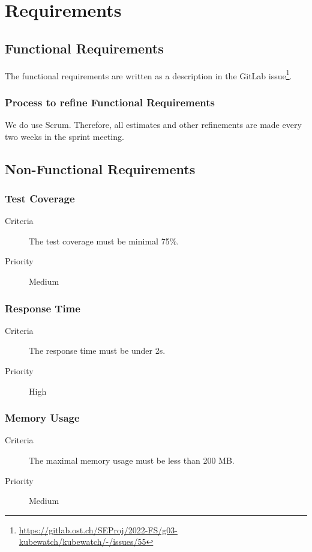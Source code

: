 \chapter{Requirements}



\section {Functional Requirements}
The functional requirements are written as a description in the GitLab issue\footnote{\url{https://gitlab.ost.ch/SEProj/2022-FS/g03-kubewatch/kubewatch/-/issues/55}}.

\subsection{Process to refine Functional Requirements}
We do use Scrum.
Therefore, all estimates and other refinements are made every two weeks in the sprint meeting.


\section {Non-Functional Requirements}
\subsection{Test Coverage}
\begin{description}
\item[Criteria] The test coverage must be minimal 75\%.
\item[Priority] Medium
\end{description}

\subsection{Response Time}
\begin{description}
\item[Criteria] The response time must be under 2s.
\item[Priority] High
\end{description}

\subsection{Memory Usage}
\begin{description}
\item[Criteria] The maximal memory usage must be less than 200 MB.
\item[Priority] Medium
\end{description}

